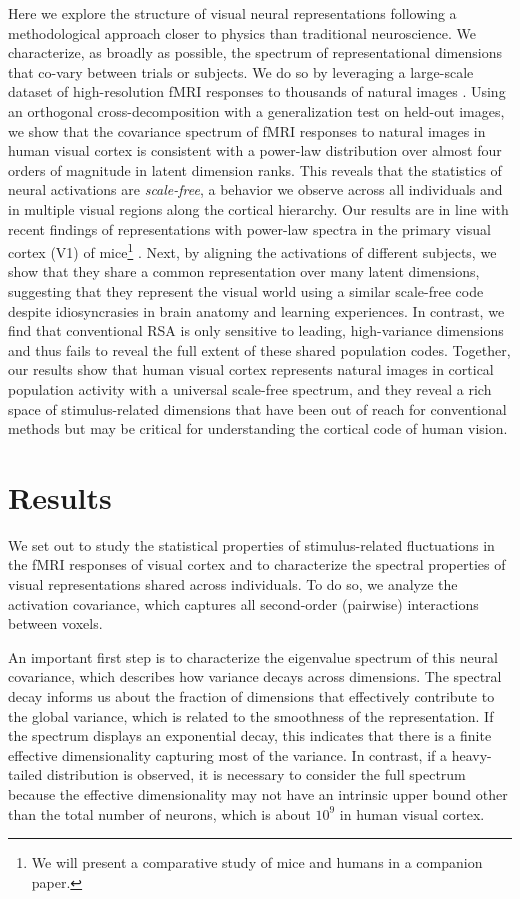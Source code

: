 \documentclass[10pt]{article}
\begin{document}
Here we explore the structure of visual neural representations following
a methodological approach closer to physics than traditional
neuroscience. We characterize, as broadly as possible, the spectrum of
representational dimensions that co-vary between trials or subjects. We
do so by leveraging a large-scale dataset of high-resolution fMRI
responses to thousands of natural images \autocite{Allen2021}. Using an
orthogonal cross-decomposition with a generalization test on held-out
images, we show that the covariance spectrum of fMRI responses to
natural images in human visual cortex is consistent with a power-law
distribution over almost four orders of magnitude in latent dimension
ranks. This reveals that the statistics of neural activations are
\emph{scale-free}, a behavior we observe across all individuals and in
multiple visual regions along the cortical hierarchy. Our results are in
line with recent findings of representations with power-law spectra in
the primary visual cortex (V1) of mice\footnote{We will present a
  comparative study of mice and humans in a companion paper.}
\autocite{Stringer2019}. Next, by aligning the activations of different
subjects, we show that they share a common representation over many
latent dimensions, suggesting that they represent the visual world using
a similar scale-free code despite idiosyncrasies in brain anatomy and
learning experiences. In contrast, we find that conventional RSA is only
sensitive to leading, high-variance dimensions and thus fails to reveal
the full extent of these shared population codes. Together, our results
show that human visual cortex represents natural images in cortical
population activity with a universal scale-free spectrum, and they
reveal a rich space of stimulus-related dimensions that have been out of
reach for conventional methods but may be critical for understanding the
cortical code of human vision.

\section{Results}\label{results}

We set out to study the statistical properties of stimulus-related
fluctuations in the fMRI responses of visual cortex and to characterize
the spectral properties of visual representations shared across
individuals. To do so, we analyze the activation covariance, which
captures all second-order (pairwise) interactions between voxels.

An important first step is to characterize the eigenvalue spectrum of
this neural covariance, which describes how variance decays across
dimensions. The spectral decay informs us about the fraction of
dimensions that effectively contribute to the global variance, which is
related to the smoothness of the representation. If the spectrum
displays an exponential decay, this indicates that there is a finite
effective dimensionality capturing most of the variance. In contrast, if
a heavy-tailed distribution is observed, it is necessary to consider the
full spectrum because the effective dimensionality may not have an
intrinsic upper bound other than the total number of neurons, which is
about \(10^9\) in human visual cortex.
\end{document}
